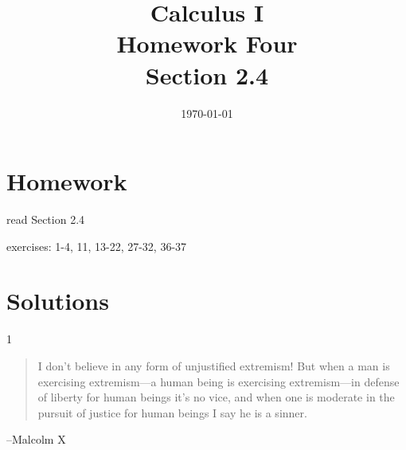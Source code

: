 \documentclass[letterpaper]{exam}
\title{Calculus I \\ Homework Four \\ Section 2.4}
\author{}
\date{\today}
\begin{document}
  \maketitle

  \section{Homework}
    \begin{itemize*}
      \item read Section 2.4
      \item exercises: 1-4, 11, 13-22, 27-32, 36-37
    \end{itemize*}

  \ifprintanswers

    \section{Solutions}

    \begin{description}

      \item[1]

    \end{description}

  \else
    \vspace{10 cm}
    \begin{quote}
      \begin{em}
        I don't believe in any form of unjustified extremism! But when a man is
        exercising extremism---a human being is exercising extremism---in
        defense of liberty for human beings it's no vice, and when one is
        moderate in the pursuit of justice for human beings I say he is a
        sinner. 
      \end{em}
    \end{quote}
    \hspace{1 cm} --Malcolm X
  \fi
\end{document}

